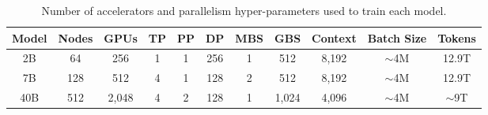 \begin{table}[h!]
\centering
\small
\begin{tabular}{@{}ccccccccccc@{}}
\toprule
Model & Nodes & GPUs & TP & PP & DP & MBS & GBS & Context & Batch Size & Tokens \\
\midrule
2B   & 64 & 256     & 1 & 1 & 256 & 1 & 512   & 8,192 & $\sim$4M & 12.9T \\
7B   & 128 & 512     & 4 & 1 & 128 & 2 & 512   & 8,192 & $\sim$4M & 12.9T \\
40B  & 512 & 2,048   & 4 & 2 & 128 & 1 & 1,024 & 4,096 & $\sim$4M & $\sim$9T \\ \bottomrule
\end{tabular}
\caption{Number of accelerators and parallelism hyper-parameters used to train each model.}
\label{tab:parallelism}
\end{table}
